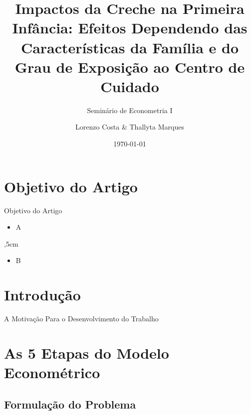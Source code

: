 \documentclass[10pt]{Beamer}
\title{Impactos da Creche na Primeira Infância: Efeitos Dependendo das Características da Família e do Grau de Exposição ao Centro de Cuidado}
\subtitle{Seminário de Econometria I}
\author{Lorenzo Costa \& Thallyta Marques}
\institute{Universidade Federal do Tocantins}
\date{\today}
\begin{document}
	
\frame{\titlepage}
\frame{\tableofcontents}

\section{Objetivo do Artigo}

\begin{frame}{Objetivo do Artigo}
\begin{block}{}
\begin{itemize}
\item A
\end{itemize}	
\end{block}

,5cm

\begin{block}{}
\begin{itemize}
\item B
\end{itemize}	
\end{block}
\end{frame}

\section{Introdução}
\begin{frame}{A Motivação Para o Desenvolvimento do Trabalho}
\end{frame}

\section{As 5 Etapas do Modelo Econométrico}
	
	\subsection{Formulação do Problema}
	
\end{document}
